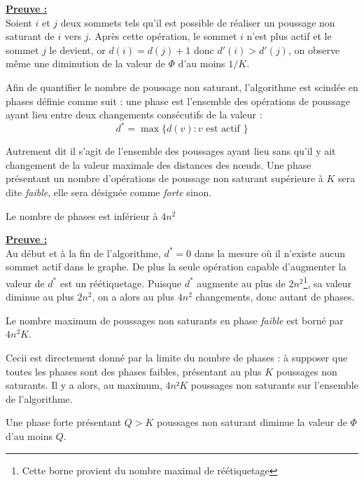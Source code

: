 \underline{\textbf{Preuve :}}\\
Soient $i$ et $j$ deux sommets tels qu'il est possible de réaliser un poussage non saturant de $i$
vers $j$.  Après cette opération, le sommet $i$ n'est plus actif et le sommet $j$ le devient, or
$d(i) = d(j) + 1$ donc $d'(i) > d'(j)$, on observe même une diminution de la valeur de $\Phi$ d'au
moins $1/K$.

Afin de quantifier le nombre de poussage non saturant, l'algorithme est scindée en phases définie
comme suit : une phase est l'ensemble des opérations de poussage ayant lieu entre deux changements
consécutifs de la valeur :
\begin{equation}
	d^* = \max\{d(v) : v \mbox{ est actif }\}
\end{equation}

Autrement dit il s'agit de l'ensemble des poussages ayant lieu sans qu'il y ait changement de la
valeur maximale des distances des n\oe uds.
Une phase présentant un nombre d'opérations de poussage non saturant supérieure à $K$ sera dite
\emph{faible}, elle sera désignée comme \emph{forte} sinon.

\begin{lemma}
	Le nombre de phases est inférieur à $4n^2$
\end{lemma}

\underline{\textbf{Preuve :}}\\
Au début et à la fin de l'algorithme, $d^* = 0$ dans la mesure où il n'existe aucun sommet actif
dans le graphe. De plus la seule opération capable d'augmenter la valeur de $d^*$ est un
réétiquetage. Puisque $d^*$ augmente au plus de $2n^2$\footnote{Cette borne provient du nombre maximal
de réétiquetage}, sa valeur diminue au plus $2n^2$, on a alors au plus $4n^2$ changements, donc
autant de phases.

\begin{corol}
	Le nombre maximum de poussages non saturants en phase \emph{faible} est borné par $4n^2K$.
\end{corol}

Cecii est directement donné par la limite du nombre de phases : à supposer que toutes les phases
sont des phases faibles, présentant au plus $K$ poussages non saturants. Il y a alors, au maximum,
$4n²K$ poussages non saturants sur l'ensemble de l'algorithme.

\begin{lemma}
	Une phase forte présentant $Q>K$ poussages non saturant diminue la valeur de $\Phi$ d'au moins
	$Q$.
\end{lemma}

